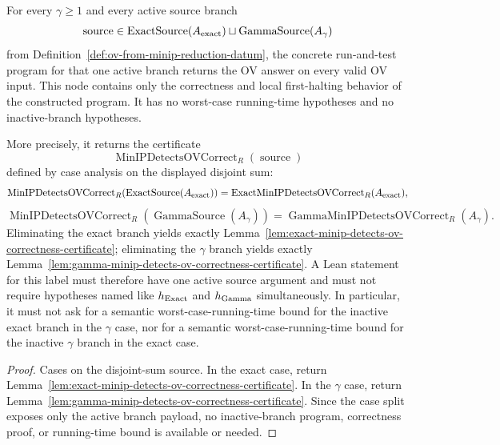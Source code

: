 \begin{lemma}
  \label{lem:min-ip-detects-ov-correctness-certificate}
  For every $\gamma\geq1$ and every active source branch
  \[
    \operatorname{source}\in
      \operatorname{ExactSource}(A_{\rm exact})
      \sqcup
      \operatorname{GammaSource}(A_{\gamma})
  \]
  from Definition~\ref{def:ov-from-minip-reduction-datum}, the concrete
  run-and-test program for that one active branch returns the OV answer on
  every valid OV input.  This node contains only the correctness and local
  first-halting behavior of the constructed program.  It has no worst-case
  running-time hypotheses and no inactive-branch hypotheses.

  More precisely, it returns the certificate
  \[
    \operatorname{MinIPDetectsOVCorrect}_R(\operatorname{source})
  \]
  defined by case analysis on the displayed disjoint sum:
  \[
    \operatorname{MinIPDetectsOVCorrect}_R
      (\operatorname{ExactSource}(A_{\rm exact}))
    =
    \operatorname{ExactMinIPDetectsOVCorrect}_R(A_{\rm exact}),
  \]
  \[
    \operatorname{MinIPDetectsOVCorrect}_R
      (\operatorname{GammaSource}(A_{\gamma}))
    =
    \operatorname{GammaMinIPDetectsOVCorrect}_R(A_{\gamma}).
  \]
  Eliminating the exact branch yields exactly
  Lemma~\ref{lem:exact-minip-detects-ov-correctness-certificate}; eliminating
  the $\gamma$ branch yields exactly
  Lemma~\ref{lem:gamma-minip-detects-ov-correctness-certificate}.  A Lean
  statement for this label must therefore have one active source argument and
  must not require hypotheses named like $h_{\rm Exact}$ and $h_{\rm Gamma}$
  simultaneously.  In particular, it must not ask for a semantic
  worst-case-running-time bound for the inactive exact branch in the
  $\gamma$ case, nor for a semantic worst-case-running-time bound for the
  inactive $\gamma$ branch in the exact case.
\end{lemma}
\begin{proof}
  Cases on the disjoint-sum source.  In the exact case, return
  Lemma~\ref{lem:exact-minip-detects-ov-correctness-certificate}.  In the
  $\gamma$ case, return
  Lemma~\ref{lem:gamma-minip-detects-ov-correctness-certificate}.  Since the
  case split exposes only the active branch payload, no inactive-branch
  program, correctness proof, or running-time bound is available or needed.
\end{proof}

